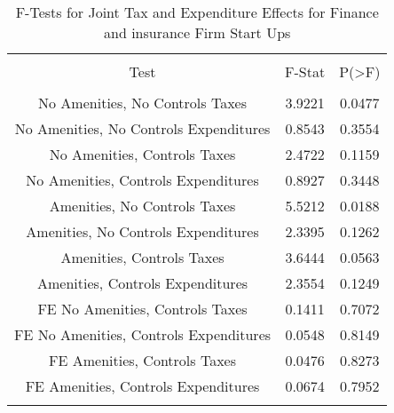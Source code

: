 
\begin{table}[!htbp] \centering 
  \caption{F-Tests for Joint Tax and Expenditure Effects for Finance and insurance Firm Start Ups} 
  \label{52Ftests} 
\begin{tabular}{@{\extracolsep{5pt}} ccc} 
\\[-1.8ex]\hline 
\hline \\[-1.8ex] 
Test & F-Stat & P(\textgreater F) \\ 
\hline \\[-1.8ex] 
No Amenities, No Controls Taxes & 3.9221 & 0.0477 \\ 
No Amenities, No Controls Expenditures & 0.8543 & 0.3554 \\ 
No Amenities, Controls Taxes & 2.4722 & 0.1159 \\ 
No Amenities, Controls Expenditures & 0.8927 & 0.3448 \\ 
Amenities, No Controls Taxes & 5.5212 & 0.0188 \\ 
Amenities, No Controls Expenditures & 2.3395 & 0.1262 \\ 
Amenities, Controls Taxes & 3.6444 & 0.0563 \\ 
Amenities, Controls Expenditures & 2.3554 & 0.1249 \\ 
FE No Amenities, Controls Taxes & 0.1411 & 0.7072 \\ 
FE No Amenities, Controls Expenditures & 0.0548 & 0.8149 \\ 
FE Amenities, Controls Taxes & 0.0476 & 0.8273 \\ 
FE Amenities, Controls Expenditures & 0.0674 & 0.7952 \\ 
\hline \\[-1.8ex] 
\end{tabular} 
\end{table} 
